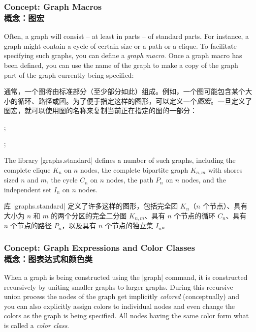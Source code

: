 \subsubsection{Concept: Graph Macros\\概念：图宏}

Often, a graph will consist -- at least in parts -- of standard parts. For
instance, a graph might contain a cycle of certain size or a path or a clique.
To facilitate specifying such graphs, you can define a \emph{graph macro}. Once
a graph macro has been defined, you can use the name of the graph to make a
copy of the graph part of the graph currently being specified:

通常，一个图将由标准部分（至少部分如此）组成。例如，一个图可能包含某个大小的循环、路径或团。为了便于指定这样的图形，可以定义一个\emph{图宏}。一旦定义了图宏，就可以使用图的名称来复制当前正在指定的图的一部分：
%
\begin{codeexample}[preamble={\usetikzlibrary{graphs.standard}}]
\tikz {};
\end{codeexample}

\begin{codeexample}[preamble={\usetikzlibrary{graphs.standard}}]
\tikz {};
\end{codeexample}

The library |graphs.standard| defines a number of such graphs, including the
complete clique $K_n$ on $n$ nodes, the complete bipartite graph $K_{n,m}$ with
shores sized $n$ and $m$, the cycle $C_n$ on $n$ nodes, the path $P_n$ on $n$
nodes, and the independent set $I_n$ on $n$ nodes.

库 |graphs.standard| 定义了许多这样的图形，包括完全团 $K_n$（$n$ 个节点）、具有大小为 $n$ 和 $m$ 的两个分区的完全二分图 $K_{n,m}$、具有 $n$ 个节点的循环 $C_n$、具有 $n$ 个节点的路径 $P_n$，以及具有 $n$ 个节点的独立集 $I_n$。

\subsubsection{Concept: Graph Expressions and Color Classes\\概念：图表达式和颜色类}

When a graph is being constructed using the |graph| command, it is constructed
recursively by uniting smaller graphs to larger graphs. During this recursive
union process the nodes of the graph get implicitly \emph{colored}
(conceptually) and you can also explicitly assign colors to individual nodes
and even change the colors as the graph is being specified. All nodes having
the same color form what is called a \emph{color class}.

